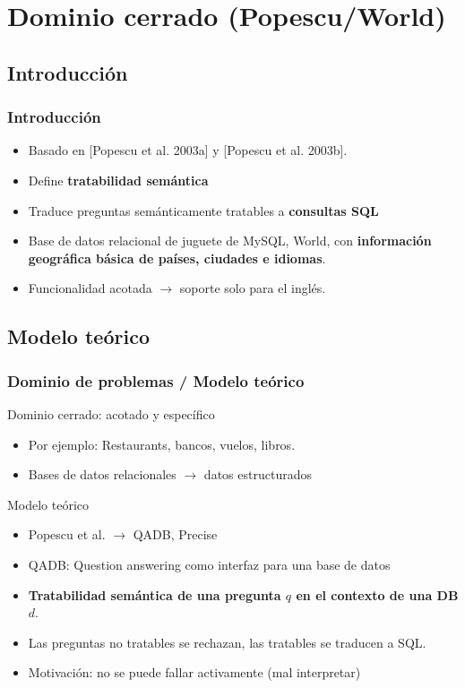 \fontsize{9.5pt}{8.2}\selectfont
\section{Dominio cerrado (Popescu/World)}
\subsection{Introducción}
\begin{frame}
\frametitle{Introducción}
\begin{itemize}
  \item Basado en [Popescu et al. 2003a] y  [Popescu et al. 2003b].
  \item Define \textbf{tratabilidad semántica}
  \item Traduce preguntas semánticamente tratables a \textbf{consultas SQL}
  \item Base de datos relacional de juguete de MySQL, World, con \textbf{información geográfica básica de países, ciudades e idiomas}.
  \item Funcionalidad acotada  $\rightarrow$ soporte solo para el inglés.
\end{itemize}
\end{frame}

\subsection{Modelo teórico}

\begin{frame}[<+->]
  \frametitle{Dominio de problemas / Modelo teórico}
   \begin{block}{Dominio cerrado: acotado y específico}
      \begin{itemize}
          \item Por ejemplo: Restaurants, bancos, vuelos, libros.
          \item Bases de datos relacionales $\rightarrow$ datos estructurados
      \end{itemize}
    \end{block}

  \begin{block}{Modelo teórico}
    \begin{itemize}
          \item Popescu et al. $\rightarrow$ QADB, Precise
          \item QADB: Question answering como interfaz para una base de datos
          \item \textbf{Tratabilidad semántica de una pregunta $q$ en el contexto de una DB $d$}.
          \item Las preguntas no tratables se rechazan, las tratables se traducen a SQL.
          \item Motivación: no se puede fallar activamente (mal interpretar)
    \end{itemize}
  \end{block}
\end{frame}


